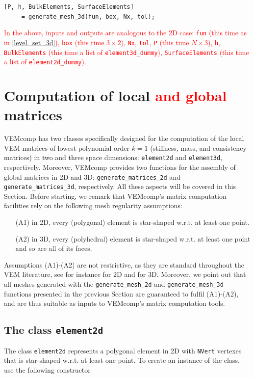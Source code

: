 \documentclass[a4paper]{article}
\newcommand{\red}[1]{\textcolor{red}{#1}}
\begin{document}
\begin{lstlisting}
[P, h, BulkElements, SurfaceElements]
     = generate_mesh_3d(fun, box, Nx, tol);
\end{lstlisting}
\red{
In the above,  inputs and outputs are analogous to the 2D case: \texttt{fun} (this time as in \eqref{level_set_3d}),  \texttt{box} (this time $3\times 2$), \texttt{Nx}, \texttt{tol}, 
\texttt{P} (this time $N\times 3$),  \texttt{h}, \texttt{BulkElements} (this time a list of \texttt{element3d\_dummy}), \texttt{SurfaceElements} (this time a list of \texttt{element2d\_dummy}).}


\section{Computation of local \red{and global} matrices}
\label{sec:computation_local_matrices}
VEMcomp has two classes specifically designed for the computation of the local VEM matrices of lowest polynomial order $k=1$ (stiffness, mass, and consistency matrices) in two and three space dimensions: \texttt{element2d} and \texttt{element3d}, respectively.  Moreover, VEMcomp provides two functions for the assembly of global matrices in 2D and 3D: \texttt{generate\_matrices\_2d} and \texttt{generate\_matrices\_3d}, respectively.  All these aspects will be covered in this Section.  Before starting, we remark that VEMcomp's matrix computation facilities rely on the following mesh regularity assumptions:
\begin{itemize}
\item[(A1)] in 2D, every (polygonal) element is star-shaped w.r.t. at least one point.
\item[(A2)] in 3D, every (polyhedral) element is star-shaped w.r.t. at least one point and so are all of its faces.
\end{itemize}
Assumptions (A1)-(A2) are not restrictive, as they are standard throughout the VEM literature, see for instance \cite{Beirao_da_Veiga_2017_stability} for 2D and \cite{da2017high} for 3D. Moreover, we point out that all meshes generated with the \texttt{generate\_mesh\_2d} and \texttt{generate\_mesh\_3d} functions presented in the previous Section are guaranteed to fulfil (A1)-(A2), and are thus suitable as inputs to VEMcomp's matrix computation tools.

\subsection{The class \texttt{element2d}}
The class \texttt{element2d} represents a polygonal element in 2D with \texttt{NVert} vertexes that is star-shaped w.r.t. at least one point. To create an instance of the class, use the following constructor
\end{document}
